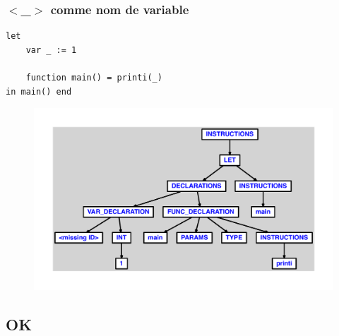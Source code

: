 \documentclass{article}
\begin{document}
\subsubsection{$ < $\_$ > $ comme nom de variable}
\begin{lstlisting}
let
	var _ := 1

	function main() = printi(_)
in main() end
\end{lstlisting}
\newpage
\begin{figure}[H]
\centering
\includegraphics[max width=\textwidth]{ast/ast_302.pdf}
\end{figure}
\newpage
\subsection{OK}
\end{document}
